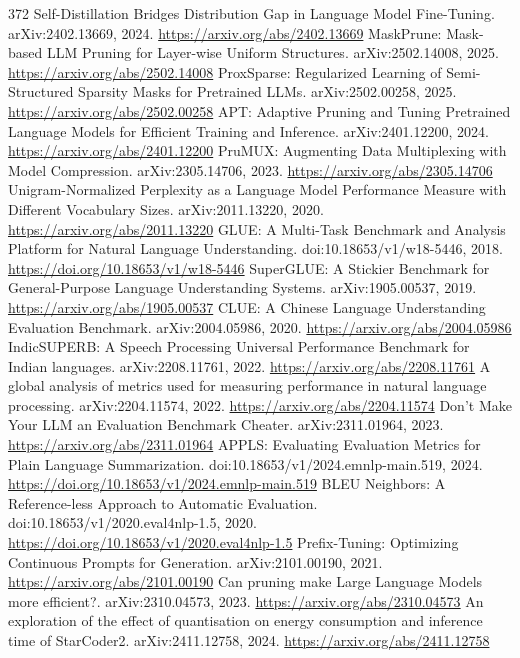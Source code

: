 \documentclass[11pt]{article}
\begin{document}
\begin{thebibliography}{372}
 Self-Distillation Bridges Distribution Gap in Language Model Fine-Tuning. arXiv:2402.13669, 2024. \url{https://arxiv.org/abs/2402.13669}
 MaskPrune: Mask-based LLM Pruning for Layer-wise Uniform Structures. arXiv:2502.14008, 2025. \url{https://arxiv.org/abs/2502.14008}
 ProxSparse: Regularized Learning of Semi-Structured Sparsity Masks for Pretrained LLMs. arXiv:2502.00258, 2025. \url{https://arxiv.org/abs/2502.00258}
 APT: Adaptive Pruning and Tuning Pretrained Language Models for Efficient Training and Inference. arXiv:2401.12200, 2024. \url{https://arxiv.org/abs/2401.12200}
 PruMUX: Augmenting Data Multiplexing with Model Compression. arXiv:2305.14706, 2023. \url{https://arxiv.org/abs/2305.14706}
 Unigram-Normalized Perplexity as a Language Model Performance Measure with Different Vocabulary Sizes. arXiv:2011.13220, 2020. \url{https://arxiv.org/abs/2011.13220}
 GLUE: A Multi-Task Benchmark and Analysis Platform for Natural Language Understanding. doi:10.18653/v1/w18-5446, 2018. \url{https://doi.org/10.18653/v1/w18-5446}
 SuperGLUE: A Stickier Benchmark for General-Purpose Language Understanding Systems. arXiv:1905.00537, 2019. \url{https://arxiv.org/abs/1905.00537}
 CLUE: A Chinese Language Understanding Evaluation Benchmark. arXiv:2004.05986, 2020. \url{https://arxiv.org/abs/2004.05986}
 IndicSUPERB: A Speech Processing Universal Performance Benchmark for Indian languages. arXiv:2208.11761, 2022. \url{https://arxiv.org/abs/2208.11761}
 A global analysis of metrics used for measuring performance in natural language processing. arXiv:2204.11574, 2022. \url{https://arxiv.org/abs/2204.11574}
 Don't Make Your LLM an Evaluation Benchmark Cheater. arXiv:2311.01964, 2023. \url{https://arxiv.org/abs/2311.01964}
 APPLS: Evaluating Evaluation Metrics for Plain Language Summarization. doi:10.18653/v1/2024.emnlp-main.519, 2024. \url{https://doi.org/10.18653/v1/2024.emnlp-main.519}
 BLEU Neighbors: A Reference-less Approach to Automatic Evaluation. doi:10.18653/v1/2020.eval4nlp-1.5, 2020. \url{https://doi.org/10.18653/v1/2020.eval4nlp-1.5}
 Prefix-Tuning: Optimizing Continuous Prompts for Generation. arXiv:2101.00190, 2021. \url{https://arxiv.org/abs/2101.00190}
 Can pruning make Large Language Models more efficient?. arXiv:2310.04573, 2023. \url{https://arxiv.org/abs/2310.04573}
 An exploration of the effect of quantisation on energy consumption and inference time of StarCoder2. arXiv:2411.12758, 2024. \url{https://arxiv.org/abs/2411.12758}

\end{thebibliography}
\end{document}
